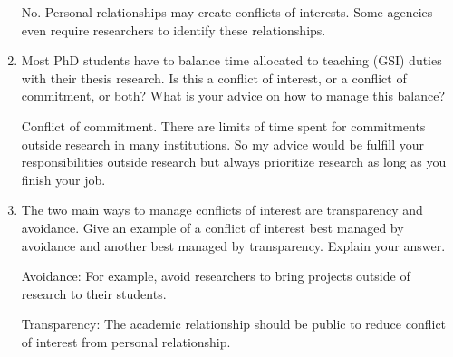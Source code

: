 \documentclass[12pt]{article}
\begin{document}
\begin{enumerate}
No. Personal relationships may create conflicts of interests. Some agencies even require researchers to identify these relationships.

\item Most PhD students have to balance time allocated to teaching (GSI) duties with their thesis research. Is this a conflict of interest, or a conflict of commitment, or both? What is your advice on how to manage this balance?

Conflict of commitment. There are limits of time spent for commitments outside research in many institutions. So my advice would be fulfill your responsibilities outside research but always prioritize research as long as you finish your job.

\item The two main ways to manage conflicts of interest are transparency and avoidance. Give an example of a conflict of interest best managed by avoidance and another best managed by transparency. Explain your answer.

Avoidance: For example, avoid researchers to bring projects outside of research to their students.

Transparency: The academic relationship should be public to reduce conflict of interest from personal relationship.

\end{enumerate}
\end{document}

